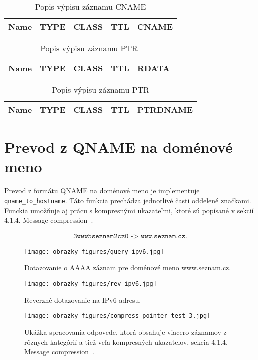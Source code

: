 \begin{table}[!ht]
    \centering
    \begin{tabular}{|c|c|c|c|c|}
        \hline
        Name & TYPE & CLASS & TTL & CNAME \\
        \hline
    \end{tabular}
    \caption{Popis výpisu záznamu CNAME}
\end{table}

\begin{table}[!ht]
    \centering
    \begin{tabular}{|c|c|c|c|c|}
        \hline
        Name & TYPE & CLASS & TTL & RDATA \\
        \hline
    \end{tabular}
    \caption{Popis výpisu záznamu PTR}
\end{table}

\begin{table}[!ht]
    \centering
    \begin{tabular}{|c|c|c|c|c|}
        \hline
        Name & TYPE & CLASS & TTL & PTRDNAME \\
        \hline
    \end{tabular}
    \caption{Popis výpisu záznamu PTR}
\end{table}

\section{Prevod z QNAME na doménové meno}
Prevod z formátu QNAME na doménové meno je implementuje \texttt{qname\_to\_hostname}. Táto funkcia prechádza jednotlivé časti oddelené značkami. Funckia umožňuje aj prácu s kompresnými ukazateľmi, ktoré sú popísané v sekcií 4.1.4. Message compression~\cite{RFC1035}.

\begin{gather*}
    \texttt{3www5seznam2cz0 -> www.seznam.cz.}
\end{gather*}

\begin{figure}[!ht]
    \centering     %
    \texttt{[image: obrazky-figures/query\_ipv6.jpg]}
    \caption{Dotazovanie o AAAA záznam pre doménové meno www.seznam.cz.}
    \label{fig:query_ipv6}
\end{figure}
\begin{figure}[!ht]
    \centering     %
    \texttt{[image: obrazky-figures/rev\_ipv6.jpg]}
    \caption{Reverzné dotazovanie na IPv6 adresu.}
    \label{fig:rev_ipv6}
\end{figure}
\begin{figure}[!ht]
    \centering     %
    \texttt{[image: obrazky-figures/compress\_pointer\_test 3.jpg]}
    \caption{Ukážka spracovania odpovede, ktorá obsahuje viacero záznamov z rôznych kategórií a tiež veľa kompresných ukazateľov, sekcia 4.1.4. Message compression~\cite{RFC1035}.}
    \label{fig:compress_pointer_test_ipv6}
\end{figure}

